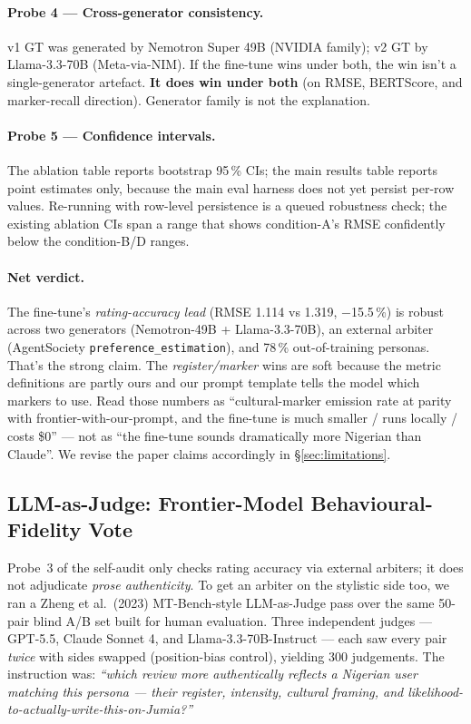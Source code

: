\documentclass[sigconf,nonacm,balance]{acmart}
\begin{document}
\paragraph{Probe 4 --- Cross-generator consistency.} v1 GT was generated
by Nemotron Super 49B (NVIDIA family); v2 GT by Llama-3.3-70B
(Meta-via-NIM). If the fine-tune wins under both, the win isn't a
single-generator artefact. \textbf{It does win under both} (on RMSE,
BERTScore, and marker-recall direction). Generator family is not the
explanation.

\paragraph{Probe 5 --- Confidence intervals.} The ablation table reports
bootstrap 95\,\% CIs; the main results table reports point estimates only,
because the main eval harness does not yet persist per-row values.
Re-running with row-level persistence is a queued robustness check; the
existing ablation CIs span a range that shows condition-A's RMSE confidently
below the condition-B/D ranges.

\paragraph{Net verdict.} The fine-tune's \emph{rating-accuracy lead}
(RMSE 1.114 vs 1.319, $-$15.5\,\%) is robust across two generators
(Nemotron-49B + Llama-3.3-70B), an external arbiter (AgentSociety
\texttt{preference\_estimation}), and 78\,\% out-of-training personas.
That's the strong claim. The \emph{register/marker} wins are soft
because the metric definitions are partly ours and our prompt template
tells the model which markers to use. Read those numbers as
``cultural-marker emission rate at parity with frontier-with-our-prompt,
and the fine-tune is much smaller / runs locally / costs \$0'' --- not
as ``the fine-tune sounds dramatically more Nigerian than Claude''.
We revise the paper claims accordingly in §\ref{sec:limitations}.

\subsection{LLM-as-Judge: Frontier-Model Behavioural-Fidelity Vote}
\label{sec:llm-judge}

Probe~3 of the self-audit only checks rating accuracy via external
arbiters; it does not adjudicate \emph{prose authenticity}. To get an
arbiter on the stylistic side too, we ran a Zheng et al.\ (2023)
MT-Bench-style LLM-as-Judge pass over the same 50-pair blind A/B set
built for human evaluation. Three independent
judges --- GPT-5.5, Claude Sonnet 4, and Llama-3.3-70B-Instruct ---
each saw every pair \emph{twice} with sides swapped (position-bias
control), yielding 300 judgements. The instruction was:
\emph{``which review more authentically reflects a Nigerian user matching
this persona --- their register, intensity, cultural framing, and
likelihood-to-actually-write-this-on-Jumia?''}
\end{document}
